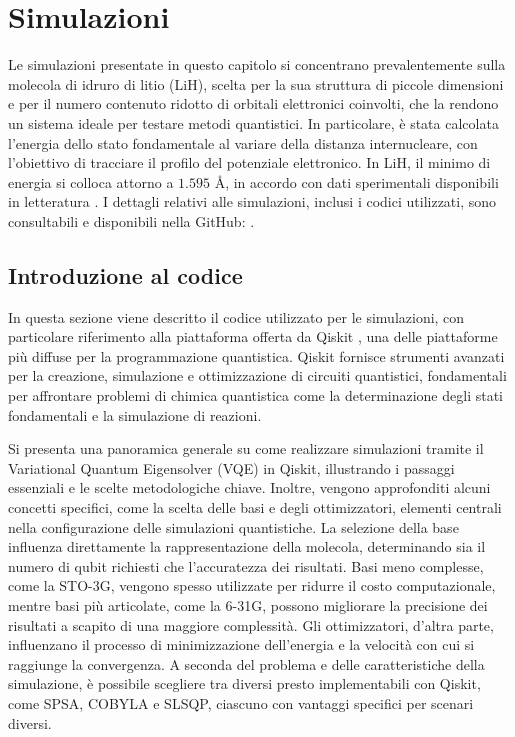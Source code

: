 
\chapter{Simulazioni}

Le simulazioni presentate in questo capitolo si concentrano prevalentemente sulla molecola di idruro di litio (LiH), scelta per la sua struttura di piccole dimensioni e per il numero contenuto ridotto di orbitali elettronici coinvolti, che la rendono un sistema ideale per testare metodi quantistici. In particolare, è stata calcolata l’energia dello stato fondamentale al variare della distanza internucleare, con l’obiettivo di tracciare il profilo del potenziale elettronico. In LiH, il minimo di energia si colloca attorno a $1.595$ \AA, in accordo con dati sperimentali disponibili in letteratura \cite{LiH_nist}. I dettagli relativi alle simulazioni, inclusi i codici utilizzati, sono consultabili e disponibili nella  GitHub: \cite{AnsOME}.

\section{Introduzione al codice}\label{sez:introduzione-codice}

In questa sezione viene descritto il codice utilizzato per le simulazioni, con particolare riferimento alla piattaforma offerta da Qiskit \cite{qiskit2024}, una delle piattaforme più diffuse per la programmazione quantistica. Qiskit fornisce strumenti avanzati per la creazione, simulazione e ottimizzazione di circuiti quantistici, fondamentali per affrontare problemi di chimica quantistica come la determinazione degli stati fondamentali e la simulazione di reazioni.

Si presenta una panoramica generale su come realizzare simulazioni tramite il Variational Quantum Eigensolver (VQE) in Qiskit, illustrando i passaggi essenziali e le scelte metodologiche chiave. Inoltre, vengono approfonditi alcuni concetti specifici, come la scelta delle basi e degli ottimizzatori, elementi centrali nella configurazione delle simulazioni quantistiche.
La selezione della base influenza direttamente la rappresentazione della molecola, determinando sia il numero di qubit richiesti che l’accuratezza dei risultati. Basi meno complesse, come la STO-3G, vengono spesso utilizzate per ridurre il costo computazionale, mentre basi più articolate, come la 6-31G, possono migliorare la precisione dei risultati a scapito di una maggiore complessità.
Gli ottimizzatori, d’altra parte, influenzano il processo di minimizzazione dell’energia e la velocità con cui si raggiunge la convergenza. A seconda del problema e delle caratteristiche della simulazione, è possibile scegliere tra diversi  presto implementabili con Qiskit, come SPSA, COBYLA e SLSQP, ciascuno con vantaggi specifici per scenari diversi.


